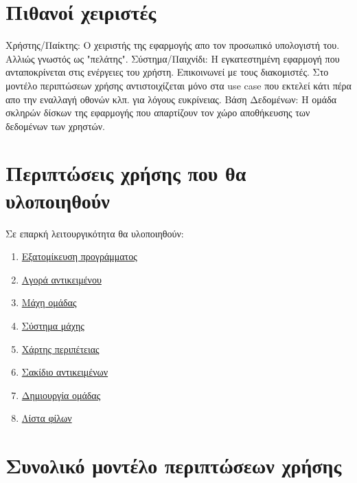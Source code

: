 \section{Πιθανοί χειριστές}

Χρήστης/Παίκτης: Ο χειριστής της εφαρμογής απο τον προσωπικό υπολογιστή του. Αλλιώς γνωστός ως "πελάτης".
\newline
Σύστημα/Παιχνίδι: Η εγκατεστημένη εφαρμογή που ανταποκρίνεται στις ενέργειες του χρήστη. Επικοινωνεί με τους διακομιστές. Στο μοντέλο περιπτώσεων χρήσης αντιστοιχίζεται μόνο στα use case που εκτελεί κάτι πέρα απο την εναλλαγή οθονών κλπ. για λόγους ευκρίνειας.
\newline
Βάση Δεδομένων: Η ομάδα σκληρών δίσκων της εφαρμογής που απαρτίζουν τον χώρο αποθήκευσης των δεδομένων των χρηστών. 

\section{Περιπτώσεις χρήσης που θα υλοποιηθούν}
Σε επαρκή λειτουργικότητα θα υλοποιηθούν:
\begin{enumerate}
\item \hyperref[sec:profile]{Εξατομίκευση προγράμματος}
\item \hyperref[sec:buy]{Αγορά αντικειμένου}
\item \hyperref[sec:clanbattle]{Μάχη ομάδας}
\item \hyperref[sec:solo]{Σύστημα μάχης}
\item \hyperref[sec:map]{Χάρτης περιπέτειας}
\item \hyperref[sec:backpack]{Σακίδιο αντικειμένων}
\item \hyperref[sec:createclan]{Δημιουργία ομάδας}
\item \hyperref[sec:friendslist]{Λίστα φίλων}
\end{enumerate}

\newpage
\section{Συνολικό μοντέλο περιπτώσεων χρήσης}

